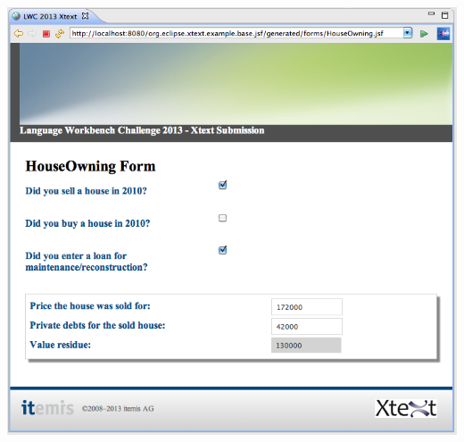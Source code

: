 \begin{center}
\includegraphics[width=15cm]{./images/chapter02/questionnaireApplication.png}
\end{center}

